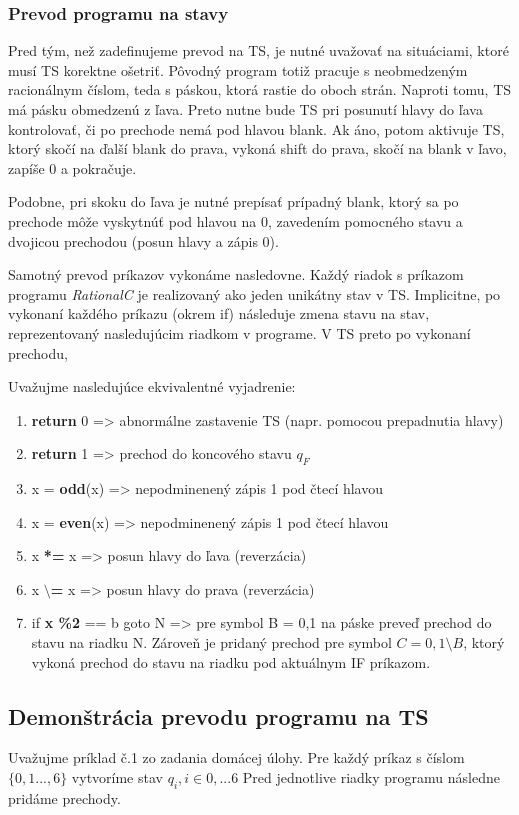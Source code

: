 \documentclass[10pt]{article}
\begin{document}
\subsubsection*{Prevod programu na stavy}
Pred tým, než zadefinujeme prevod na TS, je nutné uvažovať na situáciami, ktoré musí TS korektne
ošetriť. Pôvodný program totiž pracuje s neobmedzeným racionálnym číslom, teda s páskou, ktorá
rastie do oboch strán. Naproti tomu, TS má pásku obmedzenú z ľava. Preto nutne bude TS pri posunutí
hlavy do ľava kontrolovať, či po prechode nemá pod hlavou blank. Ak áno, potom aktivuje TS, ktorý
skočí na ďalší blank do prava, vykoná shift do prava, skočí na blank v ľavo, zapíše 0 a pokračuje.

Podobne, pri skoku do ľava je nutné prepísať prípadný blank, ktorý sa po prechode môže vyskytnúť pod
hlavou na 0, zavedením pomocného stavu a dvojicou prechodou (posun hlavy a zápis 0).

Samotný prevod príkazov vykonáme nasledovne. Každý riadok s príkazom programu \textit{RationalC} je realizovaný ako jeden unikátny stav v TS.
Implicitne, po vykonaní každého príkazu (okrem if) následuje zmena stavu na stav, reprezentovaný
nasledujúcim riadkom v programe. V TS preto po vykonaní prechodu,  

Uvažujme nasledujúce ekvivalentné vyjadrenie:
\begin{enumerate}
    \item \textbf{return} 0 => abnormálne zastavenie TS (napr. pomocou prepadnutia hlavy)
    \item \textbf{return} 1 => prechod do koncového stavu $q_F$
    \item x = \textbf{odd}(x) => nepodminenený zápis 1 pod čtecí hlavou
    \item x = \textbf{even}(x) => nepodminenený zápis 1 pod čtecí hlavou
    \item x \textbf{*=} x => posun hlavy do ľava (reverzácia)
    \item x \textbf{$\setminus$=} x => posun hlavy do prava (reverzácia)
    \item if \textbf{x \%2} == b goto N => pre symbol B = {0,1} na páske preveď prechod do stavu na riadku N. Zároveň je pridaný prechod pre symbol $C = {0,1}\setminus {B}$, ktorý
        vykoná prechod do stavu na riadku pod aktuálnym IF príkazom.
\end{enumerate}

\subsection{Demonštrácia prevodu programu na TS}
Uvažujme príklad č.1 zo zadania domácej úlohy. Pre každý príkaz s číslom $\{0,1...,6\}$ vytvoríme stav $q_i, i \in {0,...6}$
Pred jednotlive riadky programu následne pridáme prechody.
\end{document}
